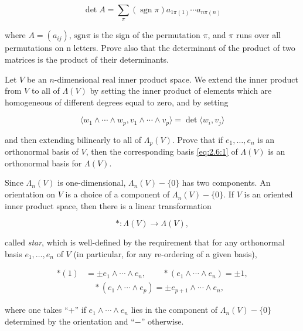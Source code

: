 \begin{problemset}
\[
\det A=\sum_{\pi}(\operatorname{sgn}\pi)a_{1\pi(1)}\cdots a_{n\pi(n)}
\]

where  $ A=(a_{ij}) $,  $ \mathrm{sgn}\pi $ is the sign of the permutation  $ \pi $, and  $ \pi $ runs over all permutations on n letters. Prove also that the determinant of the product of two matrices is the product of their determinants. 

\item Let $V$ be an $n$-dimensional real inner product space. We extend the inner product from $V$ to all of $\Lambda(V)$ by setting the inner product of elements which are homogeneous of different degrees equal to zero, and by setting

\begin{equation}
\langle w_{1}\wedge\cdots\wedge w_{p},v_{1}\wedge\cdots\wedge v_{p}\rangle=\det\langle w_{i},v_{j}\rangle
\end{equation}

and then extending bilinearly to all of $\Lambda_{p}(V)$. Prove that if $e_{1},\ldots,e_{n}$ is an orthonormal basis of $V$, then the corresponding basis \eqref{eq:2.6:1} of $\Lambda(V)$ is an orthonormal basis for $\Lambda(V)$.

Since $\Lambda_{n}(V)$ is one-dimensional, $\Lambda_{n}(V) - \{0\}$ has two components. An orientation on $V$ is a choice of a component of $\Lambda_{n}(V) - \{0\}$. If $V$ is an oriented inner product space, then there is a linear transformation

\begin{equation}
*:\Lambda(V)\to\Lambda(V),
\end{equation}

called \emph{star}, which is well-defined by the requirement that for any orthonormal basis $e_{1},\ldots,e_{n}$ of $V$ (in particular, for any re-ordering of a given basis), 


\begin{equation}\begin{aligned}*(1)&=\pm e_{1}\wedge\cdots\wedge e_{n},\qquad*(e_{1}\wedge\cdots\wedge e_{n})=\pm1,\\&\quad*(e_{1}\wedge\cdots\wedge e_{p})=\pm e_{p+1}\wedge\cdots\wedge e_{n},\end{aligned}\end{equation}


where one takes “+” if  $ e_1 \wedge \cdots \wedge e_n $ lies in the component of  $ \Lambda_n(V) - \{0\} $ determined by the orientation and “−” otherwise.


\end{problemset}
